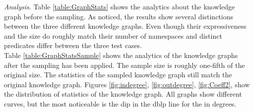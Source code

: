 \documentclass[11pt,letterpaper ,oneside ]{book}
\begin{document}
	\textit{Analysis}. Table \ref{table:GraphStats} shows the analytics about the knowledge graph before the sampling. As noticed, the results show several distinctions between the three different knowledge graphs. Even though their expressiveness and the size do roughly match their number of namespaces and distinct predicates differ between the three test cases.\\
	Table \ref{table:GraphStatsSample} shows the analytics of the knowledge graphs after the sampling has been applied. The sample size is roughly one-fifth of the original size. The statistics of the sampled knowledge graph still match the original knowledge graph.
	Figures \ref{fig:indegree},  \ref{fig:outdegree},  \ref{fig:Coeff2}, show the distribution of statistics of the knowledge graph. All graphs show different curves, but the most noticeable is the dip in the dblp line for the in degrees. 
	\begin{figure}[ht]
	\end{figure}
\end{document}
